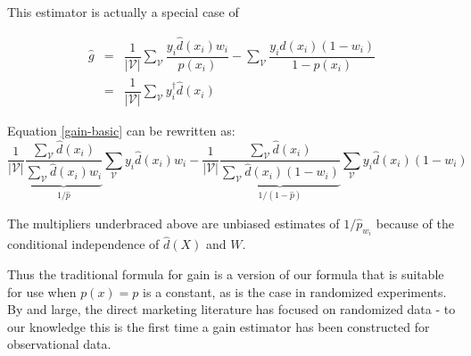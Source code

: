 This estimator is actually a special case of

\begin{equation}
\label{gain}
\begin{array}{rcl}
	\hat g & =& \dfrac{1}{|\mathcal V |} \sum_{\mathcal{V}} \dfrac{y_i  \hat d(x_i) w_i}{p(x_i)} - \sum_{\mathcal{V}} \dfrac{y_i  \hat d(x_i) (1-w_i)}{1-p(x_i)} \\
	&=& \dfrac{1}{|\mathcal V |} \sum_{\mathcal{V}} y^{\dagger}_i \hat d(x_i)
\end{array}
\end{equation}

Equation \ref{gain-basic} can be rewritten as:
\[
	 \dfrac{1}{|\mathcal V |} \underbrace{ \frac{ \sum_{\mathcal{V}} \hat d(x_i)}{\sum_{\mathcal{V}}  \hat d(x_i) w_i} }_{1/\hat p}
		  	\sum_{\mathcal{V}} y_i  \hat d(x_i) w_i - 
		\dfrac{1}{|\mathcal V |}  \underbrace{ \frac{ \sum_{\mathcal{V}} \hat d(x_i)}{\sum_{\mathcal{V}}  \hat d(x_i)  (1-w_i)} }_{1/ (1-\hat p)}
		  	\sum_{\mathcal{V}} y_i  \hat d(x_i) (1-w_i) 
\]

The multipliers underbraced above are unbiased estimates of $1/\hat p_{w_i}$ because of the conditional independence of $\hat d(X)$ and $W$. 

Thus the traditional formula for gain is a version of our formula that is suitable for use when $p(x) = p$ is a constant, as is the case in randomized experiments. By and large, the direct marketing literature has focused on randomized data - to our knowledge this is the first time a gain estimator has been constructed for observational data. 
